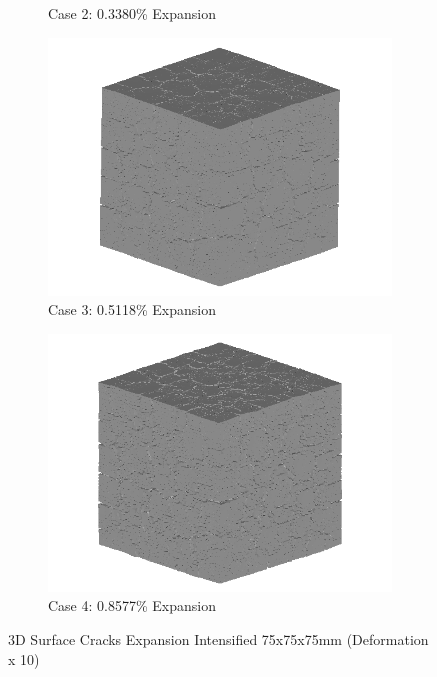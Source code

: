 \begin{figure}[!h]
\begin{subfigure}{.5\textwidth}
    \caption{Case 2: 0.3380\% Expansion}
    \end{subfigure}%
    \begin{subfigure}{.5\textwidth}
      \centering
      \includegraphics[width=.8\linewidth]{Files/exp_3D/DEF/A30X-5C_3_3d.png}
    \caption{Case 3: 0.5118\% Expansion}
    \end{subfigure}
    \begin{subfigure}{.5\textwidth}
      \centering
      \includegraphics[width=.8\linewidth]{Files/exp_3D/DEF/A30X-5C_4_3d.png}
    \caption{Case 4: 0.8577\% Expansion}
    \end{subfigure}%

  \caption{3D Surface Cracks Expansion Intensified 75x75x75mm (Deformation x 10)}
  \label{fig:DEF_A30X-5C_3D}
\end{figure}

